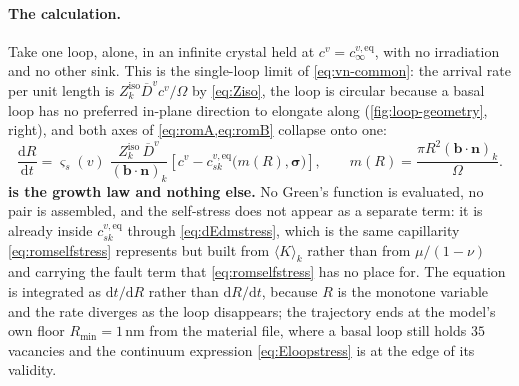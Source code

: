 \documentclass{article}
\newcommand{\bvec}{\bm b}
\newcommand{\nvec}{\bm n}
\begin{document}
\paragraph{The calculation.} Take one loop, alone, in an infinite crystal held at
$c^{v}=c^{v,\mathrm{eq}}_{\infty}$, with no irradiation and no other sink. This is
the single-loop limit of \cref{eq:vn-common}: the arrival rate per unit length is
$Z^{\mathrm{iso}}_k\overline D^{v}c^v/\Omega$ by \cref{eq:Ziso}, the loop is
circular because a basal loop has no preferred in-plane direction to elongate
along (\cref{fig:loop-geometry}, right), and both axes of
\cref{eq:romA,eq:romB} collapse onto one:
\begin{equation}
  \frac{\mathrm dR}{\mathrm dt}
   =\varsigma_s(v)\;\frac{Z^{\mathrm{iso}}_k\,\overline D^{v}}
                         {(\bvec\!\cdot\!\nvec)_k}
    \left[c^{v}-c^{v,\mathrm{eq}}_{sk}\bigl(m(R),\bm\sigma\bigr)\right],
  \qquad
  m(R)=\frac{\pi R^2(\bvec\!\cdot\!\nvec)_k}{\Omega}.
  \label{eq:isolatedR}
\end{equation}
\textbf{ is the growth law and nothing else.} No Green's
function is evaluated, no pair is assembled, and the self-stress does not appear
as a separate term: it is already inside $c^{v,\mathrm{eq}}_{sk}$ through
\cref{eq:dEdmstress}, which is the same capillarity \cref{eq:romselfstress}
represents but built from $\langle K\rangle_k$ rather than from $\mu/(1-\nu)$ and
carrying the fault term that \cref{eq:romselfstress} has no place for. The
equation is integrated as $\mathrm dt/\mathrm dR$ rather than $\mathrm dR/\mathrm
dt$, because $R$ is the monotone variable and the rate diverges as the loop
disappears; the trajectory ends at the model's own floor $R_{\min}=1\,$nm from
the material file, where a basal loop still holds $35$ vacancies and the
continuum expression \cref{eq:Eloopstress} is at the edge of its validity.
\end{document}
